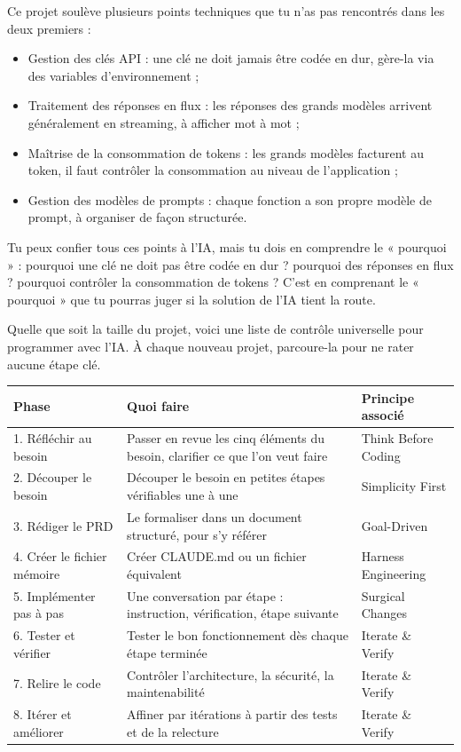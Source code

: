 
Ce projet soulève plusieurs points techniques que tu n'as pas rencontrés dans les deux premiers :

\begin{itemize}
  \item Gestion des clés API : une clé ne doit jamais être codée en dur, gère-la via des variables d'environnement ;
  \item Traitement des réponses en flux : les réponses des grands modèles arrivent généralement en streaming, à afficher mot à mot ;
  \item Maîtrise de la consommation de tokens : les grands modèles facturent au token, il faut contrôler la consommation au niveau de l'application ;
  \item Gestion des modèles de prompts : chaque fonction a son propre modèle de prompt, à organiser de façon structurée.
\end{itemize}

Tu peux confier tous ces points à l'IA, mais tu dois en comprendre le « pourquoi » : pourquoi une clé ne doit pas être codée en dur ? pourquoi des réponses en flux ? pourquoi contrôler la consommation de tokens ? C'est en comprenant le « pourquoi » que tu pourras juger si la solution de l'IA tient la route.


Quelle que soit la taille du projet, voici une liste de contrôle universelle pour programmer avec l'IA. À chaque nouveau projet, parcoure-la pour ne rater aucune étape clé.

\begin{center}
\begin{tabularx}{\linewidth}{|X|X|X|}
\hline
\textbf{Phase} & \textbf{Quoi faire} & \textbf{Principe associé} \tabularnewline
\hline
1. Réfléchir au besoin & Passer en revue les cinq éléments du besoin, clarifier ce que l'on veut faire & Think Before Coding \tabularnewline
2. Découper le besoin & Découper le besoin en petites étapes vérifiables une à une & Simplicity First \tabularnewline
3. Rédiger le PRD & Le formaliser dans un document structuré, pour s'y référer & Goal-Driven \tabularnewline
4. Créer le fichier mémoire & Créer CLAUDE.md ou un fichier équivalent & Harness Engineering \tabularnewline
5. Implémenter pas à pas & Une conversation par étape : instruction, vérification, étape suivante & Surgical Changes \tabularnewline
6. Tester et vérifier & Tester le bon fonctionnement dès chaque étape terminée & Iterate \& Verify \tabularnewline
7. Relire le code & Contrôler l'architecture, la sécurité, la maintenabilité & Iterate \& Verify \tabularnewline
8. Itérer et améliorer & Affiner par itérations à partir des tests et de la relecture & Iterate \& Verify \tabularnewline
\hline
\end{tabularx}
\end{center}

